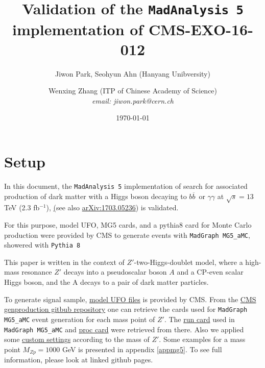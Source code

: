 \documentclass[12pt,A4paper]{article}
\title{Validation of the \texttt{MadAnalysis 5} implementation of CMS-EXO-16-012}
\author{Jiwon Park, Seohyun Ahn (Hanyang Unibversity) \and Wenxing Zhang (ITP of Chinese Academy of Science)\\
\normalsize {\it email: jiwon.park@cern.ch}
\date{\today}
}
\newcommand{\xspace}{~}
\newcommand{\bbbar}{\ensuremath{b\overline{b}}\xspace} %
\begin{document}
        \maketitle


\section{Setup}
\indent In this document, the \texttt{MadAnalysis 5} implementation of search for associated production of dark matter with a
Higgs boson decaying to \bbbar or $\gamma\gamma$ at $\sqrt{s} = 13$ TeV (2.3 fb$^{-1}$),
\href{http://cms-results.web.cern.ch/cms-results/public-results/publications/EXO-16-012/}
(see also \href{https://arxiv.org/abs/1703.05236}{arXiv:1703.05236})
is validated.

For this purpose, model UFO, MG5 cards, and a pythia8 card for Monte Carlo production were provided by CMS to generate events with \texttt{MadGraph MG5\_aMC}, showered with \texttt{Pythia 8}

This paper is written in the context of $Z'$-two-Higgs-doublet model, where a high-mass resonance $Z'$ decays into a pseudoscalar boson $A$ and a CP-even scalar Higgs boson, and the A decays to a pair of dark matter particles.

To generate signal sample, \href{http://rkhurana.web.cern.ch/rkhurana/monoH/models/}{model UFO files} is provided by CMS. From the \href{https://github.com/cms-sw/genproductions/tree/master/bin/MadGraph5_aMCatNLO/cards/production/13TeV/monoHiggs/Zp2HDM/Zprime_A0h_A0chichi}{CMS genproduction gitbub repository} one can retrieve the cards used for \texttt{MadGraph MG5\_aMC} event generation for each mass point of $Z'$. 
The \href{https://github.com/cms-sw/genproductions/blob/master/bin/MadGraph5_aMCatNLO/cards/production/13TeV/monoHiggs/Zp2HDM/Zprime_A0h_A0chichi/Zprime_A0h_A0chichi_MZp600_MA0300/Zprime_A0h_A0chichi_MZp600_MA0300_run_card.dat}{run card} used in \texttt{MadGraph MG5\_aMC} and \href{https://github.com/cms-sw/genproductions/blob/master/bin/MadGraph5_aMCatNLO/cards/production/13TeV/monoHiggs/Zp2HDM/Zprime_A0h_A0chichi/Zprime_A0h_A0chichi_MZp600_MA0300/Zprime_A0h_A0chichi_MZp600_MA0300_proc_card.dat}{proc card} were retrieved from there.
Also we applied some \href{https://github.com/cms-sw/genproductions/blob/master/bin/MadGraph5_aMCatNLO/cards/production/13TeV/monoHiggs/Zp2HDM/Zprime_A0h_A0chichi/Zprime_A0h_A0chichi_MZp600_MA0300/Zprime_A0h_A0chichi_MZp600_MA0300_customizecards.dat}{custom settings} according to the mass of $Z'$. Some examples for a mass point $M_{Zp} = 1000$ GeV is presented in appendix \ref{appmg5}. To see full information, please look at linked github pages.
\end{document}
